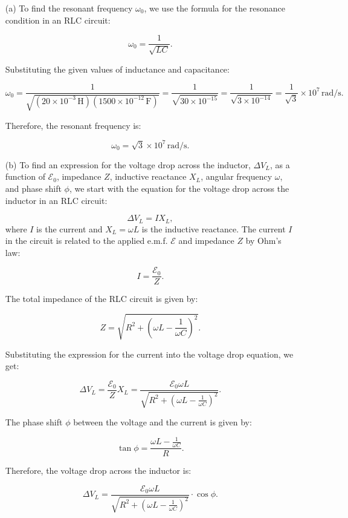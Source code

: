 \documentclass{article}
\begin{document}
\begin{enumerate}
    \item[(a)] To find the resonant frequency $\omega_0$, we use the formula for the resonance condition in an RLC circuit:

    \[
    \omega_0 = \frac{1}{\sqrt{LC}}.
    \]

    Substituting the given values of inductance and capacitance:

    \[
    \omega_0 = \frac{1}{\sqrt{(20 \times 10^{-3} \, \mathrm{H})(1500 \times 10^{-12} \, \mathrm{F})}} = \frac{1}{\sqrt{30 \times 10^{-15}}} = \frac{1}{\sqrt{3 \times 10^{-14}}} = \frac{1}{\sqrt{3}} \times 10^7 \, \mathrm{rad/s}.
    \]

    Therefore, the resonant frequency is:

    \[
    \omega_0 = \sqrt{3} \times 10^7 \, \mathrm{rad/s}.
    \]

    \item[(b)] To find an expression for the voltage drop across the inductor, $\Delta V_L$, as a function of $\mathcal{E}_0$, impedance $Z$, inductive reactance $X_L$, angular frequency $\omega$, and phase shift $\phi$, we start with the equation for the voltage drop across the inductor in an RLC circuit:

    \[
    \Delta V_L = I X_L,
    \]
    where $I$ is the current and $X_L = \omega L$ is the inductive reactance. The current $I$ in the circuit is related to the applied e.m.f. $\mathcal{E}$ and impedance $Z$ by Ohm's law:

    \[
    I = \frac{\mathcal{E}_0}{Z}.
    \]

    The total impedance of the RLC circuit is given by:

    \[
    Z = \sqrt{R^2 + (\omega L - \frac{1}{\omega C})^2}.
    \]

    Substituting the expression for the current into the voltage drop equation, we get:

    \[
    \Delta V_L = \frac{\mathcal{E}_0}{Z} X_L = \frac{\mathcal{E}_0 \omega L}{\sqrt{R^2 + (\omega L - \frac{1}{\omega C})^2}}.
    \]

    The phase shift $\phi$ between the voltage and the current is given by:

    \[
    \tan \phi = \frac{\omega L - \frac{1}{\omega C}}{R}.
    \]

    Therefore, the voltage drop across the inductor is:

    \[
    \Delta V_L = \frac{\mathcal{E}_0 \omega L}{\sqrt{R^2 + (\omega L - \frac{1}{\omega C})^2}} \cdot \cos \phi.
    \]


\end{enumerate}
\end{document}
